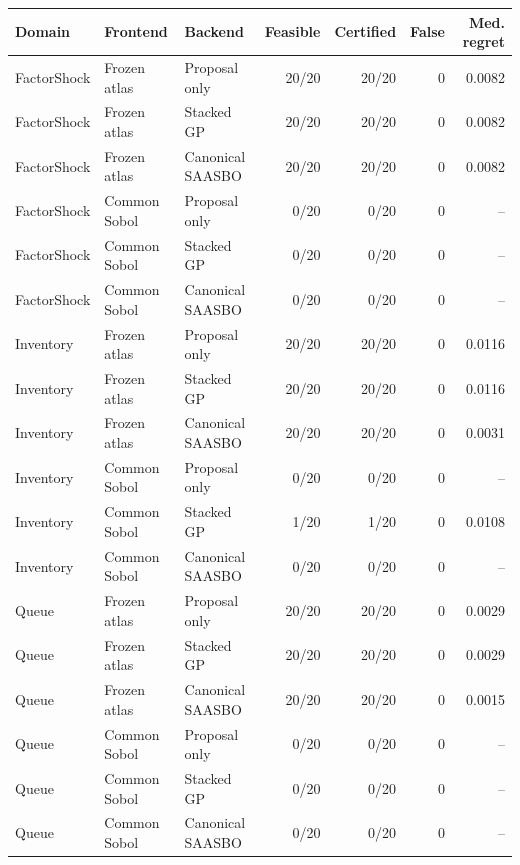 \begin{tabular}{lllrrrr}
\toprule
Domain & Frontend & Backend & Feasible & Certified & False & Med. regret \\
\midrule
FactorShock & Frozen atlas & Proposal only & 20/20 & 20/20 & 0 & 0.0082 \\
FactorShock & Frozen atlas & Stacked GP & 20/20 & 20/20 & 0 & 0.0082 \\
FactorShock & Frozen atlas & Canonical SAASBO & 20/20 & 20/20 & 0 & 0.0082 \\
FactorShock & Common Sobol & Proposal only & 0/20 & 0/20 & 0 & -- \\
FactorShock & Common Sobol & Stacked GP & 0/20 & 0/20 & 0 & -- \\
FactorShock & Common Sobol & Canonical SAASBO & 0/20 & 0/20 & 0 & -- \\
\midrule
Inventory & Frozen atlas & Proposal only & 20/20 & 20/20 & 0 & 0.0116 \\
Inventory & Frozen atlas & Stacked GP & 20/20 & 20/20 & 0 & 0.0116 \\
Inventory & Frozen atlas & Canonical SAASBO & 20/20 & 20/20 & 0 & 0.0031 \\
Inventory & Common Sobol & Proposal only & 0/20 & 0/20 & 0 & -- \\
Inventory & Common Sobol & Stacked GP & 1/20 & 1/20 & 0 & 0.0108 \\
Inventory & Common Sobol & Canonical SAASBO & 0/20 & 0/20 & 0 & -- \\
\midrule
Queue & Frozen atlas & Proposal only & 20/20 & 20/20 & 0 & 0.0029 \\
Queue & Frozen atlas & Stacked GP & 20/20 & 20/20 & 0 & 0.0029 \\
Queue & Frozen atlas & Canonical SAASBO & 20/20 & 20/20 & 0 & 0.0015 \\
Queue & Common Sobol & Proposal only & 0/20 & 0/20 & 0 & -- \\
Queue & Common Sobol & Stacked GP & 0/20 & 0/20 & 0 & -- \\
Queue & Common Sobol & Canonical SAASBO & 0/20 & 0/20 & 0 & -- \\
\bottomrule
\end{tabular}
